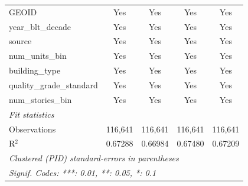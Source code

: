 \begin{tabular}{lcccc}
   GEOID                                                   & Yes             & Yes             & Yes             & Yes\\  
   year\_blt\_decade                                       & Yes             & Yes             & Yes             & Yes\\  
   source                                                  & Yes             & Yes             & Yes             & Yes\\  
   num\_units\_bin                                         & Yes             & Yes             & Yes             & Yes\\  
   building\_type                                          & Yes             & Yes             & Yes             & Yes\\  
   quality\_grade\_standard                                & Yes             & Yes             & Yes             & Yes\\  
   num\_stories\_bin                                       & Yes             & Yes             & Yes             & Yes\\  
   \midrule
   \emph{Fit statistics}\\
   Observations                                            & 116,641         & 116,641         & 116,641         & 116,641\\  
   R$^2$                                                   & 0.67288         & 0.66984         & 0.67480         & 0.67209\\  
   \midrule \midrule
   \multicolumn{5}{l}{\emph{Clustered (PID) standard-errors in parentheses}}\\
   \multicolumn{5}{l}{\emph{Signif. Codes: ***: 0.01, **: 0.05, *: 0.1}}\\
\end{tabular}
\par\endgroup
